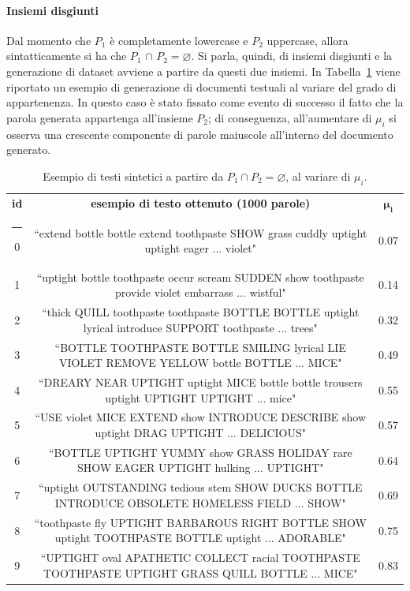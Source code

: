 \documentclass[12pt]{report}
\makeatletter
\theoremstyle{definition}
\newcommand{\thickhline}{%
    \noalign {\ifnum 0=`}\fi \hrule height 1pt
    \futurelet \reserved@a \@xhline
}
\let\emptyset\varnothing
\makeatother
\begin{document}
\paragraph{Insiemi disgiunti}
Dal momento che $P_1$ è completamente lowercase e $P_2$ uppercase, allora sintatticamente si ha che $P_1$ $\cap$ $P_2 = \emptyset$. Si parla, quindi, di insiemi disgiunti e la generazione di dataset avviene a partire da questi due insiemi. In Tabella~\ref{generationexample} viene riportato un esempio di generazione di documenti testuali al variare del grado di appartenenza. In questo caso è stato fissato come evento di successo il fatto che la parola generata appartenga all'insieme $P_2$; di conseguenza, all'aumentare di $\mu_i$ si osserva una crescente componente di parole maiuscole all'interno del documento generato.
\begin{table}
\centering
\begin{adjustbox}{max width=\textwidth}
 \begin{tabular}{|c|c|c|} 
 \hline
\textbf{id} & \textbf{esempio di testo ottenuto (1000 parole)} & $\bm{\mu_i}$  
\\ [0.5ex] 
 \thickhline
0 & ``extend bottle bottle extend toothpaste SHOW grass cuddly uptight uptight eager ... violet" & 0.07 \\ 
1 & ``uptight bottle toothpaste occur scream SUDDEN show toothpaste provide violet embarrass ... wistful" & 0.14 \\
2 & ``thick QUILL toothpaste toothpaste BOTTLE BOTTLE uptight lyrical introduce SUPPORT toothpaste ... trees" & 0.32 \\
3 & ``BOTTLE TOOTHPASTE BOTTLE SMILING lyrical LIE VIOLET REMOVE YELLOW bottle BOTTLE ... MICE" & 0.49 \\
4 & ``DREARY NEAR UPTIGHT uptight MICE bottle bottle trousers uptight UPTIGHT UPTIGHT ... mice" & 0.55\\
5 & ``USE violet MICE EXTEND show INTRODUCE DESCRIBE show uptight DRAG UPTIGHT ... DELICIOUS" & 0.57\\
6 & ``BOTTLE UPTIGHT YUMMY show GRASS HOLIDAY rare SHOW EAGER UPTIGHT hulking ... UPTIGHT" & 0.64\\
7 & ``uptight OUTSTANDING tedious stem SHOW DUCKS BOTTLE INTRODUCE OBSOLETE HOMELESS FIELD ... SHOW" & 0.69 \\
8 & ``toothpaste fly UPTIGHT BARBAROUS RIGHT BOTTLE SHOW uptight TOOTHPASTE BOTTLE uptight ... ADORABLE" & 0.75\\
9 & ``UPTIGHT oval APATHETIC COLLECT racial TOOTHPASTE TOOTHPASTE UPTIGHT GRASS QUILL BOTTLE ... MICE" & 0.83\\
 \hline
\end{tabular}
\end{adjustbox}
\caption{Esempio di testi sintetici a partire da $P_1 \cap P_2 = \emptyset$, al variare di $\mu_i$.}
\label{generationexample}
\end{table}
\end{document}

